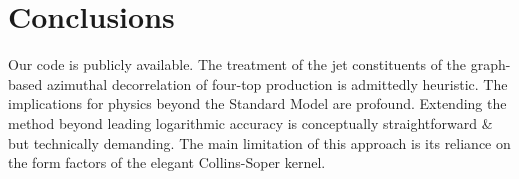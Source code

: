 \section{Conclusions}\label{sec:conclusions}

Our code is publicly available. The treatment of the jet constituents of
the graph-based azimuthal decorrelation of four-top production is
admittedly heuristic. The implications for physics beyond the Standard
Model are profound. Extending the method beyond leading logarithmic
accuracy is conceptually straightforward & but technically demanding. The
main limitation of this approach is its reliance on the form factors of
the elegant Collins-Soper kernel.


